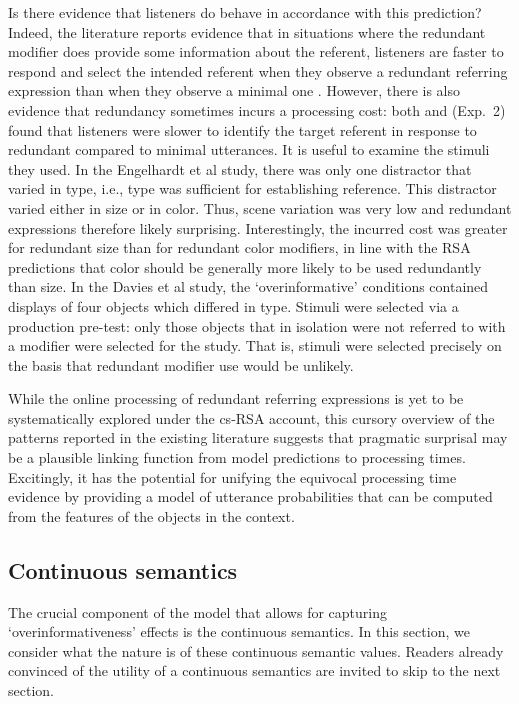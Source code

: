 \documentclass[11pt]{article}
\begin{document}
Is there evidence that listeners do behave in accordance with this prediction? Indeed, the literature reports evidence that in situations where the redundant modifier does provide some information about the referent, listeners are faster to respond and select the intended referent when they observe a redundant referring expression than when they observe a minimal one \cite{Arts2011,  Paraboni2007}. However, there is also evidence that redundancy sometimes incurs a processing cost: both  and  (Exp.~2) found that listeners were slower to identify the target referent in response to redundant compared to minimal utterances. It is useful to examine the stimuli they used. In the Engelhardt et al study, there was only one distractor that varied in type, i.e., type was sufficient for establishing reference. This distractor varied either in size or in color. Thus, scene variation was very low and redundant expressions therefore likely surprising. Interestingly, the incurred cost was greater for redundant size than for redundant color modifiers, in line with the RSA predictions that color should be generally more likely to be used redundantly than size. In the Davies et al study, the `overinformative' conditions contained displays of four objects which differed in type. Stimuli were selected via a production pre-test: only those objects that in isolation were not referred to with a modifier were selected for the study. That is, stimuli were selected precisely on the basis that redundant modifier use would be unlikely.

While the online processing of redundant referring expressions is yet to be systematically explored under the cs-RSA account, this cursory overview of the patterns reported in the existing literature suggests that pragmatic surprisal may be a plausible linking function from model predictions to processing times. Excitingly, it has the potential for unifying the equivocal processing time evidence by providing a model of utterance probabilities that can be computed from the features of the objects in the context.


\subsection{Continuous semantics}
\label{sec:contsemantics}

The crucial component of the model that allows for capturing `overinformativeness' effects is the continuous semantics.  In this section, we consider what the nature is of these continuous semantic values. Readers already convinced of the utility of a continuous semantics are invited to skip to the next section.
\end{document}
